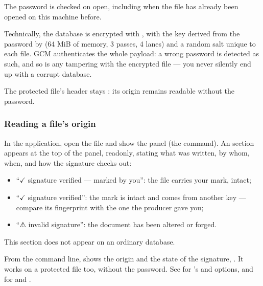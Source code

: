 \documentclass[letterpaper,10pt,english]{sphinxmanual}
\begin{document}
\sphinxAtStartPar
The password is checked on  open, including when the file has already been opened on this machine before.

\sphinxAtStartPar
Technically, the database is encrypted with , with the key derived from the password by  (64 MiB of memory, 3 passes, 4 lanes) and a random salt unique to each file. GCM authenticates the whole payload: a wrong password is detected as such, and so is any tampering with the encrypted file — you never silently end up with a corrupt database.

\sphinxAtStartPar
The protected file’s header stays : its origin remains readable without the password.


\subsubsection{Reading a file’s origin}
\label{\detokenize{manuel:lire-l-origine-d-un-fichier}}
\sphinxAtStartPar
In the application, open the file and show the  panel (the  command). An  section appears at the top of the panel, read\sphinxhyphen{}only, stating what was written, by whom, when, and how the signature checks out:
\begin{itemize}
\item {} 
\sphinxAtStartPar
“\(\checkmark\) signature verified — marked by you”: the file carries your mark, intact;

\item {} 
\sphinxAtStartPar
“\(\checkmark\) signature verified”: the mark is intact and comes from another key — compare its fingerprint with the one the producer gave you;

\item {} 
\sphinxAtStartPar
“⚠ invalid signature”: the document has been altered or forged.

\end{itemize}

\sphinxAtStartPar
This section does not appear on an ordinary database.

\sphinxAtStartPar
From the command line,  shows the origin and the state of the signature, . It works on a protected file too, without the password. See  for ’s  and  options, and for  and .
\end{document}
